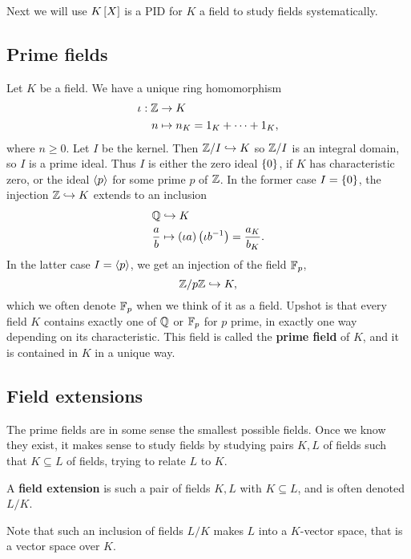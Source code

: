 Next we will use $ K\sb{X} $ is a PID for $ K $ a field to study fields systematically.

\subsection{Prime fields}

Let $ K $ be a field. We have a unique ring homomorphism
\begin{align*}
\iota : \Z & \to K \\
n & \mapsto n_K = 1_K + \dots + 1_K,
\end{align*}
where $ n \ge 0 $. Let $ I $ be the kernel. Then $ \Z / I \hookrightarrow K $ so $ \Z / I $ is an integral domain, so $ I $ is a prime ideal. Thus $ I $ is either the zero ideal $ \cb{0} $, if $ K $ has characteristic zero, or the ideal $ \ab{p} $ for some prime $ p $ of $ \Z $. In the former case $ I = \cb{0} $, the injection $ \Z \hookrightarrow K $ extends to an inclusion
\begin{align*}
\Q & \hookrightarrow K \\
\dfrac{a}{b} & \mapsto \rb{\iota a}\rb{\iota b^{-1}} = \dfrac{a_K}{b_K}.
\end{align*}
In the latter case $ I = \ab{p} $, we get an injection of the field $ \F_p $,
$$ \Z / p\Z \hookrightarrow K, $$
which we often denote $ \F_p $ when we think of it as a field. Upshot is that every field $ K $ contains exactly one of $ \Q $ or $ \F_p $ for $ p $ prime, in exactly one way depending on its characteristic. This field is called the \textbf{prime field} of $ K $, and it is contained in $ K $ in a unique way.

\subsection{Field extensions}

The prime fields are in some sense the smallest possible fields. Once we know they exist, it makes sense to study fields by studying pairs $ K, L $ of fields such that $ K \subseteq L $ of fields, trying to relate $ L $ to $ K $.

\begin{definition}
A \textbf{field extension} is such a pair of fields $ K, L $ with $ K \subseteq L $, and is often denoted $ L / K $.
\end{definition}

Note that such an inclusion of fields $ L / K $ makes $ L $ into a $ K $-vector space, that is a vector space over $ K $.


